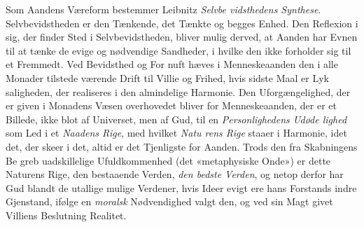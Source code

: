 \documentclass[12pt,a4paper]{book}
\begin{document}
Som Aandens Væreform bestemmer Leibnitz \emph{Selvbe\-%
vidsthedens Synthese}. Selvbevidstheden er den Tænkende,
det Tænkte og begges Enhed. Den Reflexion i sig, der finder Sted
i Selvbevidstheden, bliver mulig derved, at Aanden har Evnen
til at tænke de evige og nødvendige Sandheder, i hvilke den
ikke forholder sig til et Fremmedt. Ved Bevidsthed og For\-%
nuft hæves i Menneskeaanden den i alle Monader tilstede\-%
værende Drift til Villie og Frihed, hvis sidste Maal er Lyk\-%
saligheden, der realiseres i den almindelige Harmonie. Den
Uforgængelighed, der er given i Monadens Væsen overhovedet
bliver for Menneskeaanden, der er et Billede, ikke blot af
Universet, men af Gud, til en \emph{Personlighedens Udøde\-%
lighed} som Led i et \emph{Naadens Rige}, med hvilket \emph{Natu\-%
rens Rige} staaer i Harmonie, idet det, der skeer i det, altid
er det Tjenligste for Aanden. Trods den fra Skabningens Be\-%
greb uadskillelige Ufuldkommenhed (det «metaphysiske Onde»)
er dette Naturens Rige, den bestaaende Verden, \emph{den bedste
Verden}, og netop derfor har Gud blandt de utallige mulige
Verdener, hvis Ideer evigt ere hans Forstands indre Gjenstand,
ifølge en \emph{moralsk} Nødvendighed valgt den, og ved sin Magt
givet Villiens Beslutning Realitet.
\end{document}
